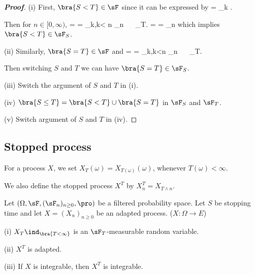 \begin{proof}[\bf Proof]
\ben
\item [(i)] First, $\bra{S<T}\in \sF$ since it can be expressed by 
\be
{} = \bigcup_{k\in \N} .
\ee

Then for $n\in [0,\infty)$,
\be
{} \cap {} =  = \bigcup_{k\in \N,k< n} \cap {} \in \sF_n \ \ra \   \in \sF_T.
\ee
\be
{} \cap {} =   \cup {} =  \cup {} \in \sF_n \nonumber
\ee
which implies $\bra{S<T}  \in \sF_S$.

\item [(ii)] Similarly, $\bra{S=T}\in \sF$ and 
\be
{}\cap {} =  = \bigcup_{k\in \N,k<n} \cap {} \in \sF_n \ \ra \   \in \sF_T.
\ee

Then switching $S$ and $T$ we can have $\bra{S=T}  \in \sF_S$.

\item [(iii)] Switch the argument of $S$ and $T$ in (i).

\item [(iv)] $\bra{S\leq T} = \bra{S<T}\cup\bra{S=T}$ in $\sF_S$ and $\sF_T$.
\item [(v)] Switch argument of $S$ and $T$ in (iv).
\een
\end{proof}


\subsection{Stopped process}

\begin{definition}\label{def:stopped_process_discrete}
For a process $X$, we set $X_T (\omega) = X_{T(\omega)}(\omega)$, whenever $T(\omega) < \infty$.

We also define the stopped process $X^T$ by $X^T_n = X_{T\land n}$.
\end{definition}



\begin{proposition}
Let $(\Omega,\sF, (\sF_n)_{n\geq 0},\pro)$ be a filtered probability space. Let $S$ be stopping time and let $X = (X_n)_{n\geq 0}$ be an adapted process. ($X: \Omega \to E$)
\ben
\item [(i)] $X_T\ind_{\bra{T <\infty}}$ is an $\sF_T$-measurable random variable.
\item [(ii)] $X^T$ is adapted.
\item [(iii)] If $X$ is integrable, then $X^T$ is integrable.
\een
\end{proposition}

